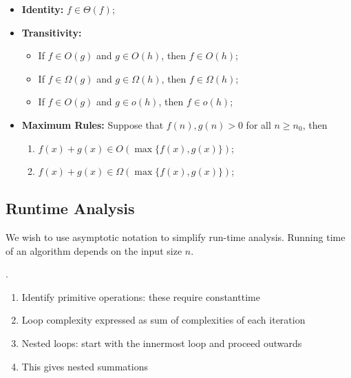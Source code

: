 \documentclass{article}
\begin{document}
\begin{itemize}
    \item \textbf{Identity:} $f \in \Theta(f)$;
    \item \textbf{Transitivity:} \begin{itemize}
        \item If $f \in O(g)$ and $g \in O(h)$, then $f \in O(h)$; 
        \item If $f \in \Omega(g)$ and $g \in \Omega(h)$, then $f \in \Omega(h)$; 
        \item If $f \in O(g)$ and $g \in o(h)$, then $f \in o(h)$; 
    \end{itemize}
    \item \textbf{Maximum Rules:} Suppose that $f(n), g(n) > 0$ for all $n \geq n_0$, then \begin{enumerate}
        \item $f(x) + g(x) \in O(\max \{ f(x), g(x) \})$; 
        \item $f(x) + g(x) \in \Omega(\max \{ f(x), g(x) \})$; 
    \end{enumerate}
\end{itemize}

\newpage

\subsection{Runtime Analysis}

We wish to use asymptotic notation to simplify run-time analysis. Running time of an algorithm depends on the input size $n$. 

\begin{algo}[].
    \begin{enumerate}
        \item Identify primitive operations: these require constanttime 
        \item Loop complexity expressed as sum of complexities  of each iteration 
        \item Nested loops: start with the innermost loop and proceed outwards 
        \item This gives nested summations
    \end{enumerate}
\end{algo}
\end{document}
